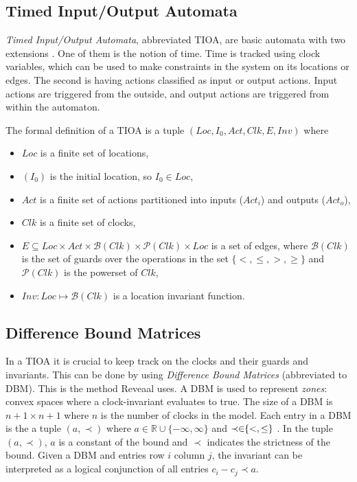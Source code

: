 \subsection{Timed Input/Output Automata}\label{sec:TIOA}
\emph{Timed Input/Output Automata}, abbreviated TIOA, are basic automata with two extensions \cite{ecdartheory}. One of them is the notion of time. Time is tracked using clock variables, which can be used to make constraints in the system on its locations or edges. The second is having actions classified as input or output actions. Input actions are triggered from the outside, and output actions are triggered from within the automaton. 

The formal definition of a TIOA is a tuple \cite{ecdartheory} $(Loc, I_{0}, Act, Clk, E, Inv)$
where

\begin{itemize}
    \item $Loc$ is a finite set of locations,
    \item $(I_{0})$ is the initial location, so $I_{0} \in Loc$,
    \item $Act$ is a finite set of actions partitioned into inputs ($Act_{i}$) and outputs ($Act_{o}$),
    \item $Clk$ is a finite set of clocks,
    \item $E \subseteq Loc \times Act \times \mathcal{B}(Clk) \times \mathcal{P}(Clk) \times Loc$ is a set of edges, where $\mathcal{B}(Clk)$ is the set of guards over the operations in the set $\{<, \leq, >, \geq\}$ and $\mathcal{P}(Clk)$ is the powerset of $Clk$,
    \item $Inv : Loc \mapsto \mathcal{B}(Clk)$ is a location invariant function.
\end{itemize}

\subsection{Difference Bound Matrices}\label{sec:DBM}
In a TIOA it is crucial to keep track on the clocks and their guards and invariants. This can be done by using \emph{Difference Bound Matrices} (abbreviated to DBM). This is the method Reveaal uses.
A DBM is used to represent \emph{zones}: convex spaces where a clock-invariant evaluates to true. The size of a DBM is $n+1 \times n+1$ where $n$ is the number of clocks in the model.
Each entry in a DBM is the a tuple $(a, \prec)$ where $a \in \mathbb{R} \cup \{ -\infty, \infty \}$ and $\prec \in \hspace{-3pt} \{<, \leq\}$ \cite{peron:hal-00189821, Joost:DBM19}. In the tuple $(a, \prec)$, $a$ is a constant of the bound and $\prec$ indicates the strictness of the bound.
Given a DBM and entries row $i$ column $j$, the invariant can be interpreted as a logical conjunction of all entries $c_i - c_j \prec a$. 


